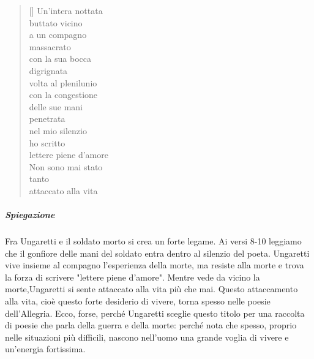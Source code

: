 \documentclass[12pt]{report}
\begin{document}
	
		\renewcommand{\poemtoc}{subsection}
		\settowidth{\versewidth}{There was an old party of Lyme}
		
		\begin{verse}[\versewidth]
			Un'intera nottata \\
			buttato vicino \\
			a un compagno \\
			massacrato \\
			con la sua bocca \\
			digrignata \\
			volta al plenilunio \\
			con la congestione \\
			delle sue mani \\
			penetrata \\
			nel mio silenzio \\
			ho scritto \\
			lettere piene d'amore \\
			
			Non sono mai stato \\
			tanto \\
			attaccato alla vita\\
		\end{verse}
		
		\subparagraph[Veglia]{Spiegazione}Fra Ungaretti e il soldato morto
		si crea un forte legame. Ai versi 8-10 leggiamo che il	gonfiore delle mani del soldato entra dentro al silenzio del
		poeta. Ungaretti vive insieme al compagno l’esperienza della morte, ma resiste alla morte e trova la forza di scrivere
		"lettere piene d’amore". Mentre vede da vicino la morte,Ungaretti si sente attaccato alla vita più che mai. Questo
		attaccamento alla vita, cioè questo forte desiderio di vivere, torna spesso nelle poesie dell’Allegria. Ecco, forse,
		perché Ungaretti sceglie questo titolo per una raccolta di poesie che parla della guerra e della morte: perché nota
		che spesso, proprio nelle situazioni più difficili, nascono nell’uomo una grande voglia di vivere e un’energia fortissima.
		
		\onecolumn
		\renewcommand{\poemtoc}{subsection}
		\settowidth{\versewidth}{There was an old party of Lyme}
		
\end{document}
